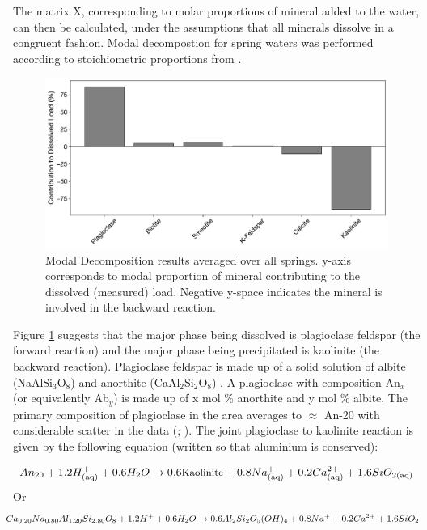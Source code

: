 The matrix X, corresponding to molar proportions of mineral added to the water, can then be calculated, under the assumptions that all minerals dissolve in a congruent fashion. Modal decompostion for spring waters was performed according to stoichiometric proportions from \textcite{bickleDiscriminationCarbonateSilicate2015}.\\

\begin{figure}[h]
    \centering
    \includegraphics[width=\textwidth]{Normalized_Average_Mineral_Volume_Changes.pdf}
    \caption{Modal Decomposition results averaged over all springs. y-axis corresponds to modal proportion of mineral contributing to the dissolved (measured) load. Negative y-space indicates the mineral is involved in the backward reaction.}
    \label{fig:modal}
\end{figure}

\FloatBarrier

Figure \ref{fig:modal} suggests that the major phase being dissolved is plagioclase feldspar (the forward reaction) and the major phase being precipitated is kaolinite (the backward reaction). Plagioclase feldspar is made up of a solid solution of albite (NaAlSi$_3$O$_8$) and anorthite (CaAl$_2$Si$_2$O$_8$) \parencite{HENRY1982381}. A plagioclase with composition An$_x$ (or equivalently Ab$_y$) is made up of x mol \% anorthite and y mol \% albite. The primary composition of plagioclase in the area averages to $\approx$ An-20 with considerable scatter in the data (\cite{bickleDiscriminationCarbonateSilicate2015}; \cite{knightImpactAdsorptionDesorption2024}). The joint plagioclase to kaolinite reaction is given by the following equation (written so that aluminium is conserved):


\begin{equation}
    \small
    An_{20} + 1.2 H^{+}_{\text{(aq)}} + 0.6 H_{2}O \rightarrow
    0.6 \text{Kaolinite} + 0.8 Na^{+}_{\text{(aq)}} + 0.2 Ca^{2+}_{\text{(aq)}} + 1.6 SiO_{2 \text{(aq)}}
\label{eq:10}
\end{equation}
\quad Or
\begin{equation}
    \hspace{-0.3cm}
    \small
    Ca_{0.20}Na_{0.80}Al_{1.20}Si_{2.80}O_{8} + 1.2H^{+} + 0.6 H_{2}O \rightarrow 
    0.6 Al_{2}Si_{2}O_{5}(OH)_{4} + 0.8 Na^{+} + 0.2 Ca^{2+} + 1.6 SiO_{2}
    \label{eq:9}
\end{equation}



